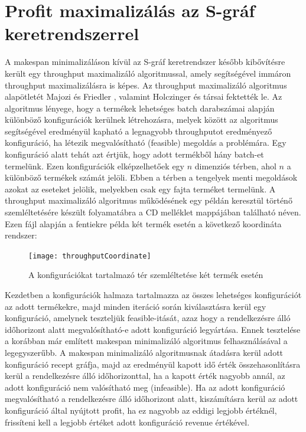 \section{Profit maximalizálás az S-gráf keretrendszerrel} \label{SgraphProfitMax}
A makespan minimalizáláson kívül az S-gráf keretrendszer később kibővítésre került egy throughput maximalizáló algoritmussal, amely segítségével immáron throughput maximalizálásra is képes.
Az throughput maximalizáló algoritmus alapötletét Majozi és Friedler \cite{doi:10.1021ie0604472}, valamint Holczinger és társai \cite{HOLCZINGER2007649} fektették le.
Az algoritmus lényege, hogy a termékek lehetséges batch darabszámai alapján különböző konfigurációk kerülnek létrehozásra, melyek között az algoritmus segítségével eredményül kapható a legnagyobb throughputot eredményező konfiguráció, ha létezik megvalósítható (feasible) megoldás a problémára.
Egy konfiguráció alatt tehát azt értjük, hogy adott termékből hány batch-et termelünk.
Ezen konfigurációk elképzelhetőek egy $n$ dimenziós térben, ahol $n$ a különböző termékek számát jelöli.
Ebben a térben a tengelyek menti megoldások azokat az eseteket jelölik, melyekben csak egy fajta terméket termelünk.
A throughput maximalizáló algoritmus működésének egy példán keresztül történő szemléltetésére készült folyamatábra a CD melléklet  mappájában található  néven.
Ezen fájl alapján a fentiekre példa két termék esetén a következő koordináta rendszer:
 \begin{figure}[H]
\begin{center}
\texttt{[image: throughputCoordinate]}
\caption{A konfigurációkat tartalmazó tér szemléltetése két termék esetén}
\label{throughputCoordinate}
\end{center}
\end{figure}
Kezdetben a konfigurációk halmaza tartalmazza az összes lehetséges konfigurációt az adott termékekre, majd minden iteráció során kiválasztásra kerül egy konfiguráció, amelynek teszteljük feasible-itását, azaz hogy a rendelkezésre álló időhorizont alatt megvalósítható-e adott konfiguráció legyártása.
Ennek tesztelése a korábban már említett makespan minimalizáló algoritmus felhasználásával a legegyszerűbb.
A makespan minimalizáló algoritmusnak átadásra kerül adott konfiguráció recept gráfja, majd az eredményül kapott idő érték összehasonlításra kerül a rendelkezésre álló időhorizonttal, ha a kapott érték nagyobb annál, az adott konfiguráció nem valósítható meg (infeasible). 
Ha az adott konfiguráció megvalósítható a rendelkezésre álló időhorizont alatt, kiszámításra kerül az adott konfiguráció által nyújtott profit, ha ez nagyobb az eddigi legjobb értéknél, frissíteni kell a legjobb értéket adott konfiguráció revenue értékével.
